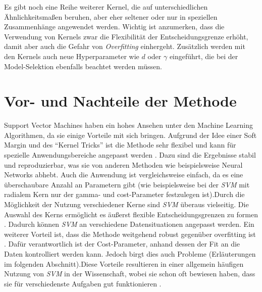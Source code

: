 \documentclass[
]{article}
\begin{document}
Es gibt noch eine Reihe weiterer Kernel, die auf unterschiedlichen
Ähnlichkeitsmaßen beruhen, aber eher seltener oder nur in speziellen
Zusammenhänge angewendet werden. Wichtig ist anzumerken, dass die
Verwendung von Kernels zwar die Flexibilität der Entscheidungsgrenze
erhöht, damit aber auch die Gefahr von \textit{Overfitting} einhergeht.
Zusätzlich werden mit den Kernels auch neue Hyperparameter wie \(d\)
oder \(\gamma\) eingeführt, die bei der Model-Selektion ebenfalls
beachtet werden müssen.\\

\section{Vor- und Nachteile der Methode}

Support Vector Machines haben ein hohes Ansehen unter den Machine
Learning Algorithmen, da sie einige Vorteile mit sich bringen. Aufgrund
der Idee einer Soft Margin und des ``Kernel Tricks'' ist die Methode
sehr flexibel und kann für spezielle Anwendungsbereiche angepasst werden
\parencite{bennettSupportVectorMachines2000}. Dazu sind die Ergebnisse
stabil und reproduzierbar, was sie von anderen Methoden wie
beispielsweise Neural Networks abhebt. Auch die Anwendung ist
vergleichsweise einfach, da es eine überschaubare Anzahl an Parametern
gibt (wie beispielsweise bei der \textit{SVM} mit radialem Kern nur der
gamma- und cost-Parameter festzulegen ist).\newline Durch die
Möglichkeit der Nutzung verschiedener Kerne sind \textit{SVM} überaus
vielseitig. Die Auswahl des Kerns ermöglicht es äußerst flexible
Entscheidungsgrenzen zu formen
\parencite{kuhnAppliedPredictiveModeling2013}. Dadurch können
\textit{SVM} an verschiedene Datensituationen angepasst werden.\newline
Ein weiterer Vorteil ist, dass die Methode weitgehend robust gegenüber
overfitting ist \parencite{kuhnAppliedPredictiveModeling2013}. Dafür
verantwortlich ist der Cost-Parameter, anhand dessen der Fit an die
Daten kontrolliert werden kann. Jedoch birgt dies auch Probleme
(Erläuterungen im folgenden Abschnitt).\newline Diese Vorteile
resultieren in einer allgemein häufigen Nutzung von \textit{SVM} in der
Wissenschaft, wobei sie schon oft bewiesen haben, dass sie für
verschiedenste Aufgaben gut funktionieren
\parencite{kuhnAppliedPredictiveModeling2013}.
\end{document}
